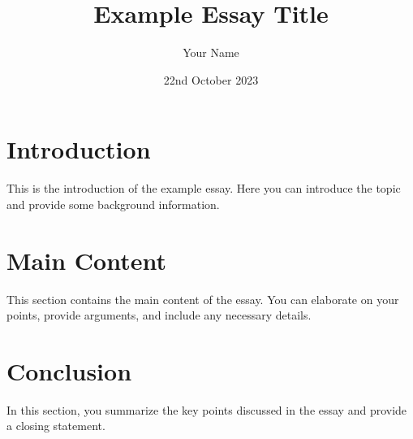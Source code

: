 \documentclass{article}
\title{Example Essay Title}
\author{Your Name}
\date{22nd October 2023}
\begin{document}
\maketitle

\section{Introduction}
This is the introduction of the example essay. Here you can introduce the topic and provide some background information.

\section{Main Content}
This section contains the main content of the essay. You can elaborate on your points, provide arguments, and include any necessary details.

\section{Conclusion}
In this section, you summarize the key points discussed in the essay and provide a closing statement.
\end{document}
